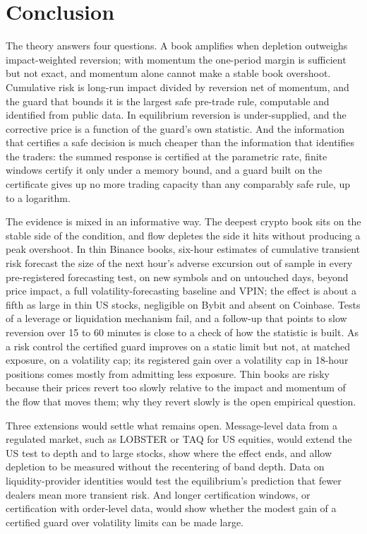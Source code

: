 \section{Conclusion}\label{p2:sec:conclusion}

The theory answers four questions. A book amplifies when depletion outweighs impact-weighted reversion; with momentum the one-period margin is sufficient but not exact, and momentum alone cannot make a stable book overshoot. Cumulative risk is long-run impact divided by reversion net of momentum, and the guard that bounds it is the largest safe pre-trade rule, computable and identified from public data. In equilibrium reversion is under-supplied, and the corrective price is a function of the guard's own statistic. And the information that certifies a safe decision is much cheaper than the information that identifies the traders: the summed response is certified at the parametric rate, finite windows certify it only under a memory bound, and a guard built on the certificate gives up no more trading capacity than any comparably safe rule, up to a logarithm.

The evidence is mixed in an informative way. The deepest crypto book sits on the stable side of the condition, and flow depletes the side it hits without producing a peak overshoot. In thin Binance books, six-hour estimates of cumulative transient risk forecast the size of the next hour's adverse excursion out of sample in every pre-registered forecasting test, on new symbols and on untouched days, beyond price impact, a full volatility-forecasting baseline and VPIN; the effect is about a fifth as large in thin US stocks, negligible on Bybit and absent on Coinbase. Tests of a leverage or liquidation mechanism fail, and a follow-up that points to slow reversion over 15 to 60 minutes is close to a check of how the statistic is built. As a risk control the certified guard improves on a static limit but not, at matched exposure, on a volatility cap; its registered gain over a volatility cap in 18-hour positions comes mostly from admitting less exposure. Thin books are risky because their prices revert too slowly relative to the impact and momentum of the flow that moves them; why they revert slowly is the open empirical question.

Three extensions would settle what remains open. Message-level data from a regulated market, such as LOBSTER or TAQ for US equities, would extend the US test to depth and to large stocks, show where the effect ends, and allow depletion to be measured without the recentering of band depth. Data on liquidity-provider identities would test the equilibrium's prediction that fewer dealers mean more transient risk. And longer certification windows, or certification with order-level data, would show whether the modest gain of a certified guard over volatility limits can be made large.


